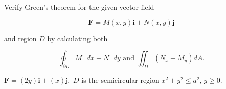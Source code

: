 \documentclass[11pt,letterpaper,boxed]{pset}
\begin{document}
    
    \begin{problem} [6.2.4]
    	Verify Green's theorem for the given vector field 
    
    	\[\textbf{F} = M(x,y)\textbf{i} + N(x,y)\textbf{j}\]
    
    	and region $D$ by calculating both 
    
    	\[\oint_{\partial D} M\textrm{ } dx + N\textrm{ } dy \textrm{  and } \iint_D (N_x - M_y)dA.\]
    
    	$\textbf{F} = (2y)\textbf{i} + (x)\textbf{j},$ $D$ is the semicircular region $x^2+y^2 \leq a^2$, $y \geq 0$.
    
    \end{problem}
    \newpage
\end{document}
